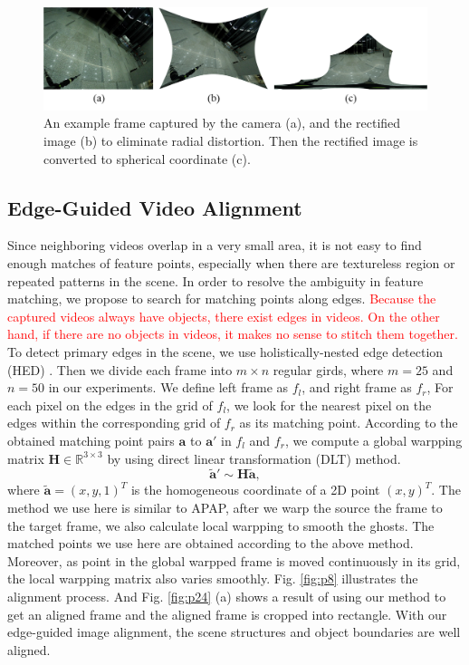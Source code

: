 \documentclass[conference]{IEEEtran}
\begin{document}
\begin{figure}[t]
\centering
\includegraphics[scale=0.25]{picture57.png}
\caption{An example frame captured by the camera (a), and the rectified image (b) to eliminate radial distortion. Then the rectified image is converted to spherical coordinate (c).}
\label{fig:ori_cal_pro}
\end{figure}




\subsection{Edge-Guided Video Alignment}
\label{ssec:edge-detection}

Since neighboring videos overlap in a very small area, it is not easy to find enough matches of feature points, 
especially when there are textureless region or repeated patterns in the scene. 
In order to resolve the ambiguity in feature matching, we propose to search for matching points along edges.
\textcolor{red}{Because the captured videos always have objects, there exist edges in videos. 
On the other hand, if there are no objects in videos, it makes no sense to stitch them together.}
To detect primary edges in the scene, we use holistically-nested edge detection (HED) \cite{xie2015holistically}. 
Then we divide each frame into $m \times n$ regular girds, where $m=25$ and $n=50$ in our experiments.
We define left frame as $f_l$, and right frame as $f_r$,
For each pixel on the edges in the grid of $f_l$, we look for the nearest pixel on the edges within the corresponding grid of $f_r$ as its matching point.
According to the obtained matching point pairs $\mathbf{a}$ to $\mathbf{a}'$ in $f_l$ and $f_r$, 
we compute a global warpping matrix $\mathbf{H} \in \mathbb{R}^{3 \times 3}$ by using direct linear transformation (DLT) method.
\begin{equation}
\widetilde{\textbf{a}}' \sim \mathbf{H} \widetilde{\textbf{a}},
\end{equation}
where $\widetilde{\mathbf{a}}=(x,y,1)^{T}$ is the homogeneous coordinate of a 2D point $(x,y)^{T}$.
The method we use here is similar to APAP, after we warp the source the frame to the target frame, we also calculate local warpping to smooth the ghosts.
The matched points we use here are obtained according to the above method. 
Moreover, as point in the global warpped frame is moved continuously in its grid, the local warpping matrix also varies smoothly.
Fig. \ref{fig:p8} illustrates the alignment process. And Fig. \ref{fig:p24} (a) shows a result of using our method to get an aligned frame 
and the aligned frame is cropped into rectangle.
With our edge-guided image alignment, the scene structures and object boundaries are well aligned. 
\end{document}
